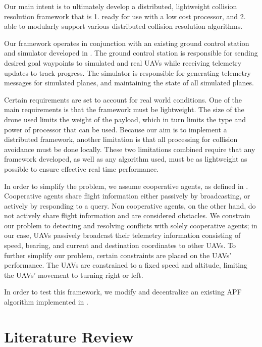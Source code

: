 \documentclass[conference]{IEEEtran}
\begin{document}
Our main intent is to ultimately develop a distributed, lightweight collision resolution framework  that is 1. ready for use with a low cost processor, and 2. able to modularly support various distributed collision resolution algorithms. 

Our framework operates in conjunction with an existing ground control station and simulator developed in \cite{holt2012comparison}. The ground control station is responsible for sending desired goal waypoints to simulated and real UAVs while receiving telemetry updates to track progress. The simulator is responsible for generating telemetry messages for simulated planes, and maintaining the state of all simulated planes. 

Certain requirements are set to account for real world conditions. One of the main requirements is that the framework must be lightweight. The size of the drone used limits the weight of the payload, which in turn limits the type and power of processor that can be used. Because our aim is to implement a distributed framework, another limitation is that all processing for collision avoidance must be done locally. These two limitations combined require that any framework developed, as well as any algorithm used, must be as lightweight as possible to ensure effective real time performance.

In order to simplify the problem, we assume cooperative agents, as defined in \cite{roadmap2002roadmap}. Cooperative agents share flight information either passively by broadcasting, or actively by responding to a query. Non cooperative agents, on the other hand, do not actively share flight information and are considered obstacles. We constrain our problem to detecting and resolving conflicts with solely cooperative agents; in our case, UAVs passively broadcast their telemetry information consisting of speed, bearing, and current and destination coordinates to other UAVs. To further simplify our problem, certain constraints are placed on the UAVs' performance.  The UAVs are constrained to a fixed speed and altitude, limiting the UAVs' movement to turning right or left. 

In order to test this framework, we modify and decentralize an existing APF algorithm implemented in \cite{siudynamic}.


\section{Literature Review}
\label{sec:litReview}
\end{document}
